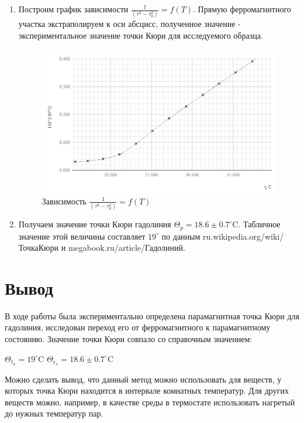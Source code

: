 \documentclass[a4paper]{article}
\begin{document}
\begin{enumerate}
\item Построим график зависимости $\frac{1}{(\tau^2-\tau_0^2)} = f(T)$. Прямую ферромагнитного участка экстраполируем к оси абсцисс, полученное значение - экспериментальное значение точки Кюри для исследуемого образца. 

\begin{figure}[h]
    \centering
    \includegraphics[width=\textwidth]{graph1.PNG}
    \caption{Зависимость $\frac{1}{(\tau^2-\tau_0^2)} = f(T)$}
    \label{fig:vac}
\end{figure}

\item Получаем значение точки Кюри гадолиния $\Theta_p = 18.6 \pm 0.7 ^{\circ}$C. Табличное значение этой величины составляет $19^{\circ}$ по данным ru.wikipedia.org/wiki/ТочкаКюри и megabook.ru/article/Гадолиний. 
\end{enumerate}

\section{Вывод}

В ходе работы была экспериментально определена парамагнитная точка Кюри для гадолиния, исследован переход его от ферромагнитного к парамагнитному состоянию. Значение точки Кюри совпало со справочным значением:
\begin{center}
    $\Theta_t_h = 19^{\circ}$C \hspace{1cm} $\Theta_e_x = 18.6 \pm 0.7^{\circ}$C
\end{center}
Можно сделать вывод, что данный метод можно использовать для веществ, у которых точка Кюри находится в интервале комнатных температур. Для других веществ можно, например, в качестве среды в термостате использовать нагретый до нужных температур пар.
\end{document}
